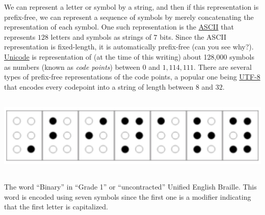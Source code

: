 We can represent a letter or symbol by a string, and then if this
representation is prefix-free, we can represent a sequence of symbols by
merely concatenating the representation of each symbol. One such
representation is the \href{https://en.wikipedia.org/wiki/ASCII}{ASCII}
that represents \(128\) letters and symbols as strings of \(7\) bits.
Since the ASCII representation is fixed-length, it is automatically
prefix-free (can you see why?).
\href{https://en.wikipedia.org/wiki/Unicode}{Unicode} is representation
of (at the time of this writing) about 128,000 symbols as numbers (known
as \emph{code points}) between \(0\) and \(1,114,111\). There are
several types of prefix-free representations of the code points, a
popular one being \href{https://en.wikipedia.org/wiki/UTF-8}{UTF-8} that
encodes every codepoint into a string of length between \(8\) and
\(32\).


\begin{marginfigure}
\centering
\includegraphics[width=\linewidth, height=1.5in, keepaspectratio]{../figure/braille.png}
\caption{The word ``Binary'' in ``Grade 1'' or ``uncontracted'' Unified
English Braille. This word is encoded using seven symbols since the
first one is a modifier indicating that the first letter is
capitalized.}
\label{braillefig}
\end{marginfigure}

\hypertarget{braille}{}

